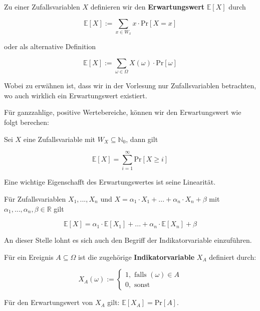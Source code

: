 \begin{definition}
    Zu einer Zufallsvariablen $X$ definieren wir den \textbf{Erwartungswert} $\mathbb{E}[X]$ durch

    $$\mathbb{E}[X] := \sum_{x \in W_x} x \cdot \text{Pr}[X = x]$$

    oder als alternative Definition

    $$\mathbb{E}[X] := \sum_{\omega \in \Omega} X(\omega) \cdot \text{Pr}[\omega]$$

    Wobei zu erwähnen ist, dass wir in der Vorlesung nur Zufallsvariablen betrachten, wo auch wirklich
    ein Erwartungswert existiert.
\end{definition}
\bigskip

Für ganzzahlige, positive Wertebereiche, können wir den Erwartungswert wie folgt berechen:

\begin{satz}[Satz]
    Sei $X$ eine Zufallsvariable mit $W_X \subseteq \mathbb{N}_0$, dann gilt

    $$\mathbb{E}[X] = \sum_{i=1}^\infty \text{Pr}[X \geq i]$$
\end{satz}
\bigskip

Eine wichtige Eigenschafft des Erwartungswertes ist seine Linearität.

\begin{satz}
    Für Zufallsvariablen $X_1, ... , X_n$ und $X = \alpha_1 \cdot X_1 + ... + \alpha_n \cdot X_n + \beta$
    mit $\alpha_1, ..., \alpha_n, \beta \in \mathbb{R}$ gilt

    $$\mathbb{E}[X] = \alpha_1 \cdot \mathbb{E}[X_1] + ... + \alpha_n \cdot \mathbb{E}[X_n] + \beta$$
\end{satz}
\bigskip

An dieser Stelle lohnt es sich auch den Begriff der Indikatorvariable einzuführen.

\begin{definition}
    Für ein Ereignis $A \subseteq \Omega$ ist die zugehörige \textbf{Indikatorvariable} $X_A$ definiert
    durch:

    $$X_A(\omega) := \begin{cases}
        1, \text{ falls }(\omega) \in A\\
        0, \text{ sonst }
    \end{cases}$$

    Für den Erwartungswert von $X_A$ gilt: $\mathbb{E}[X_A] = \text{Pr}[A]$.
\end{definition}

